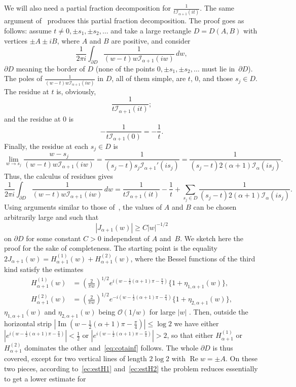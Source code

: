 \documentclass[10pt,a4paper]{article}
\theoremstyle{plain}
\theoremstyle{definition}
\numberwithin{equation}{section} %
\newcommand{\I}{\mathcal{I}}
\renewcommand{\Re}{\operatorname{Re}}
\renewcommand{\Im}{\operatorname{Im}}
\begin{document}
We will also need a partial fraction decomposition for $\frac{1}{t\I_{\alpha+1}(it)}$.
The same argument of~\cite[\S\,15.41, p.~497--498]{Wat} produces this partial fraction decomposition. The proof goes as follows: assume $t \not= 0, \pm s_1, \pm s_2, \dots$ and take a large rectangle $D=D(A,B)$ with vertices $\pm A \pm i B$, where $A$ and $B$ are positive, and consider
\[
   \frac{1}{2\pi i} \int_{\partial D}
   \frac{1}{(w-t)w \I_{\alpha+1}(iw)} \, dw,
\]
$\partial D$ meaning the border of $D$ (none of the points $0, \pm s_1, \pm s_2, \dots$ must lie in~$\partial D$).
The poles of $\frac{1}{(w-t)w \I_{\alpha+1}(iw)}$ in $D$, all of them simple, are $t$, $0$, and those $s_j \in D$. The residue at $t$ is, obviously,
\[
   \frac{1}{t \I_{\alpha+1}(it)};
\]
and the residue at $0$ is
\[
   - \frac{1}{t \I_{\alpha+1}(0)} = - \frac{1}{t}.
\]
Finally, the residue at each $s_j \in D$ is
\[
   \lim_{w \to s_j} \frac{w-s_j}{(w-t)w \I_{\alpha+1}(iw)}
   = \frac{1}{(s_j - t) s_j \I_{\alpha+1}'(is_j)}
   = \frac{1}{(s_j - t) 2(\alpha+1) \I_{\alpha}(is_j)}.
\]
Thus, the calculus of residues gives
\begin{equation}
\label{eq:residuo}
   \frac{1}{2\pi i} \int_{\partial D}
   \frac{1}{(w-t)w \I_{\alpha+1}(iw)} \, dw
   = \frac{1}{t \I_{\alpha+1}(it)} - \frac{1}{t}
   + \sum_{s_j \in D}
   \frac{1}{(s_j - t) 2(\alpha+1) \I_{\alpha}(is_j)}.
\end{equation}
Using arguments similar to those of~\cite[\S\,15.41, p.~498]{Wat}, the values of $A$ and $B$ can be chosen arbitrarily large and such that
\begin{equation}
\label{eq:cotainf}
   |J_{\alpha+1}(w)| \geq C |w|^{-1/2}
\end{equation}
on $\partial D$ for some constant $C > 0$ independent of $A$ and~$B$.
We sketch here the proof for the sake of completeness. The starting point is the equality
$2J_{\alpha+1}(w) = H^{(1)}_{\alpha+1}(w) + H^{(2)}_{\alpha+1}(w)$, where the Bessel functions of the third kind satisfy the estimates
\begin{align}
\label{ec:estH1}
   H_{\alpha+1}^{(1)}(w) &= \left(\frac{2}{\pi w}\right)^{1/2}
   e^{i(w-\frac{1}{2}(\alpha+1)\pi - \frac{\pi}{4})}
   \{ 1 + \eta_{1,\alpha+1}(w)\},
   \\
\label{ec:estH2}
   H_{\alpha+1}^{(2)}(w) &= \left(\frac{2}{\pi w}\right)^{1/2}
   e^{-i(w-\frac{1}{2}(\alpha+1)\pi - \frac{\pi}{4})}
   \{ 1 + \eta_{2,\alpha+1}(w)\},
\end{align}
$\eta_{1,\alpha+1}(w)$ and $\eta_{2,\alpha+1}(w)$ being $\mathcal{O}(1/w)$ for large $|w|$ \cite[\S\,15.4, p.~496]{Wat}. Then, outside the horizontal strip $|\Im(w-\frac{1}{2}(\alpha+1)\pi - \frac{\pi}{4})| \leq \log 2$ we have either $|e^{i(w-\frac{1}{2}(\alpha+1)\pi - \frac{\pi}{4})}| < \frac{1}{2}$ or $|e^{i(w-\frac{1}{2}(\alpha+1)\pi - \frac{\pi}{4})}| > 2$, so that either $H_{\alpha+1}^{(1)}$ or $H_{\alpha+1}^{(2)}$ dominates the other and~\eqref{eq:cotainf} follows. The whole $\partial D$ is thus covered, except for two vertical lines of length $2\log 2$ with $\Re w = \pm A$. On these two pieces, according to~\eqref{ec:estH1} and~\eqref{ec:estH2} the problem reduces essentially to get a lower estimate for
\end{document}
